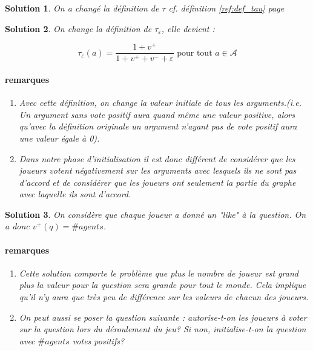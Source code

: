 \documentclass[12pt]{article}
\theoremstyle{defi}
\theoremstyle{not}
\theoremstyle{prob}
\newtheorem{solution}{Solution}[problem]
\begin{document}
\color{blue}
  \begin{solution}
    On a changé la définition de $\tau$ cf. définition \ref{ref:def_tau} page \pageref{ref:def_tau}
  \end{solution}

\color{red}
\begin{solution}
  On change la définition de $\tau_\varepsilon$, elle devient :

  $$\tau_\varepsilon(a) = \frac{1 + v^+}{1 + v^+ + v^- + \varepsilon} \mbox{ pour tout } a \in \mathcal{A}$$

  \paragraph{remarques}
    \begin{enumerate}
      \item Avec cette définition, on change la valeur initiale de tous les arguments.(i.e. Un argument sans vote positif aura quand même une valeur positive, alors qu'avec la définition originale un argument n'ayant pas de vote positif aura une valeur égale à 0).

      \item Dans notre phase d'initialisation il est donc différent de considérer que les joueurs votent négativement sur les arguments avec lesquels ils ne sont pas d'accord et de considérer que les joueurs ont seulement la partie du graphe avec laquelle ils sont d'accord.
    \end{enumerate}
\end{solution}

\begin{solution}
  On considère que chaque joueur a donné un "like" à la question. On a donc $v^+(q) = \#agents$.

  \paragraph{remarques}
    \begin{enumerate}
      \item Cette solution comporte le problème que plus le nombre de joueur est grand plus la valeur pour la question sera grande pour tout le monde. Cela implique qu'il n'y aura que très peu de différence sur les valeurs de chacun des joueurs.

      \item On peut aussi se poser la question suivante : autorise-t-on les joueurs à voter sur la question lors du déroulement du jeu? Si non, initialise-t-on la question avec $\#agents$ votes positifs?
    \end{enumerate}
\end{solution}
\end{document}
